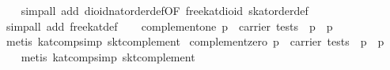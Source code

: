 \begin{isabellebody}
\ \ \isamarkupfalse%
\ {}simp{}all\ add{}\ dioid{}nat{}order{}def{}OF\ free{}kat{}dioid{}\ skat{}order{}def{}\isanewline
\ \ \isamarkupfalse%
\ {}simp{}all\ add{}\ free{}kat{}def{}\isanewline
\ \ \isamarkupfalse%
%
\endisatagproof
{\isafoldproof}%
%
\isadelimproof
\isanewline
%
\endisadelimproof
\isanewline
\isanewline
\isanewline
{}\isamarkupfalse%
\ complement{}one{}\ {}p\ {}\ carrier\ tests\ {}\ p\ {}\ {}p\ {}\ {}{}\isanewline
%
\isadelimproof
\ \ %
\endisadelimproof
%
\isatagproof
{}\isamarkupfalse%
\ {}metis\ kat{}comp{}simp\ skt{}complement{}{}%
\endisatagproof
{\isafoldproof}%
%
\isadelimproof
\isanewline
%
\endisadelimproof
\isanewline
{}\isamarkupfalse%
\ complement{}zero{}\ {}p\ {}\ carrier\ tests\ {}\ p\ {}\ {}p\ {}\ {}{}\isanewline
%
\isadelimproof
\ \ %
\endisadelimproof
%
\isatagproof
{}\isamarkupfalse%
\ {}metis\ kat{}comp{}simp\ skt{}complement{}{}%

\end{isabellebody}

